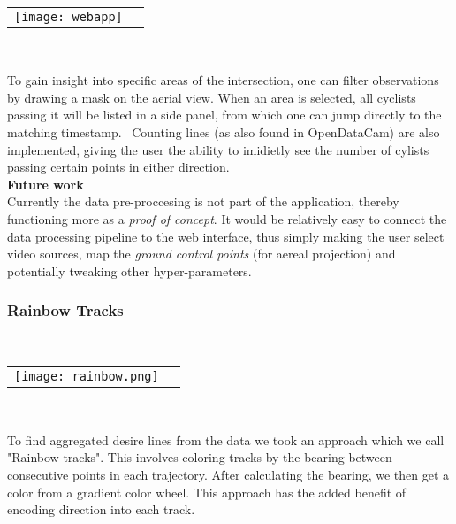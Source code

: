 \ \\ 
\raggedbottom
\begin{tabular}{@{}cc}
\texttt{[image: webapp]} 
\end{tabular}
\label{webapp}
\

To gain insight into specific areas of the intersection, one can filter observations by drawing a mask on the aerial view. 
When an area is selected, all cyclists passing it will be listed in a side panel, from which one can jump directly to the matching timestamp.
\
Counting lines (as also found in OpenDataCam) are also implemented, giving the user the ability to imidietly see the number of 
cylists passing certain points in either direction.
\ \\

\textbf{Future work} \\
Currently the data pre-proccesing is not part of the application, thereby functioning more as a \textit{proof of concept}.
It would be relatively easy to connect the data processing pipeline to the web interface, thus simply making the user 
select video sources, map the \textit{ground control points} (for aereal projection) and potentially tweaking other hyper-parameters. 

\subsubsection{Rainbow Tracks}

\ \\ 
\noindent
\begin{tabular}{@{}cc}
\texttt{[image: rainbow.png]} 
\end{tabular}
\label{Rainbow}
\

To find aggregated desire lines from the data we took an approach which we call "Rainbow tracks". This involves coloring tracks by the bearing between consecutive points in each trajectory. After calculating the bearing, we then get a color from a gradient color wheel. This approach has the added benefit of encoding direction into 
each track.
\ \\ 

